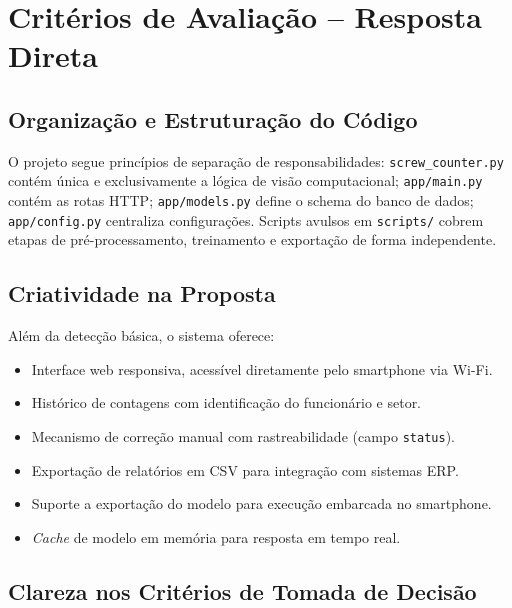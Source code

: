 \documentclass[12pt,a4paper]{article}
\begin{document}
\section{Crit\'erios de Avalia\c{c}\~ao -- Resposta Direta}

\subsection{Organiza\c{c}\~ao e Estrutura\c{c}\~ao do C\'odigo}

O projeto segue princ\'ipios de separa\c{c}\~ao de responsabilidades:
\texttt{screw\_counter.py} cont\'em \'unica e exclusivamente a l\'ogica de vis\~ao
computacional; \texttt{app/main.py} cont\'em as rotas HTTP; \texttt{app/models.py}
define o schema do banco de dados; \texttt{app/config.py} centraliza configura\c{c}\~oes.
Scripts avulsos em \texttt{scripts/} cobrem etapas de pr\'e-processamento, treinamento
e exporta\c{c}\~ao de forma independente.

\subsection{Criatividade na Proposta}

Al\'em da detec\c{c}\~ao b\'asica, o sistema oferece:
\begin{itemize}[leftmargin=*]
  \item Interface web responsiva, acess\'ivel diretamente pelo smartphone via Wi-Fi.
  \item Hist\'orico de contagens com identifica\c{c}\~ao do funcion\'ario e setor.
  \item Mecanismo de corre\c{c}\~ao manual com rastreabilidade (campo \texttt{status}).
  \item Exporta\c{c}\~ao de relat\'orios em CSV para integra\c{c}\~ao com sistemas ERP.
  \item Suporte a exporta\c{c}\~ao do modelo para execu\c{c}\~ao embarcada no smartphone.
  \item \emph{Cache} de modelo em mem\'oria para resposta em tempo real.
\end{itemize}

\subsection{Clareza nos Crit\'erios de Tomada de Decis\~ao}
\end{document}
